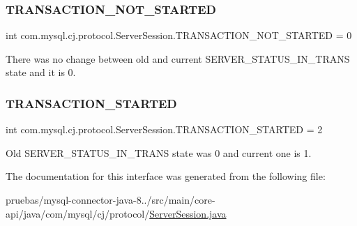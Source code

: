 \subsubsection{\texorpdfstring{T\+R\+A\+N\+S\+A\+C\+T\+I\+O\+N\+\_\+\+N\+O\+T\+\_\+\+S\+T\+A\+R\+T\+ED}{TRANSACTION\_NOT\_STARTED}}
{\footnotesize\ttfamily int com.\+mysql.\+cj.\+protocol.\+Server\+Session.\+T\+R\+A\+N\+S\+A\+C\+T\+I\+O\+N\+\_\+\+N\+O\+T\+\_\+\+S\+T\+A\+R\+T\+ED = 0\hspace{0.3cm}{\ttfamily [static]}}

There was no change between old and current S\+E\+R\+V\+E\+R\+\_\+\+S\+T\+A\+T\+U\+S\+\_\+\+I\+N\+\_\+\+T\+R\+A\+NS state and it is 0. \mbox{\label{interfacecom_1_1mysql_1_1cj_1_1protocol_1_1_server_session_af60b0a2d347c48deeb686f4a47510b5d}} 
\subsubsection{\texorpdfstring{T\+R\+A\+N\+S\+A\+C\+T\+I\+O\+N\+\_\+\+S\+T\+A\+R\+T\+ED}{TRANSACTION\_STARTED}}
{\footnotesize\ttfamily int com.\+mysql.\+cj.\+protocol.\+Server\+Session.\+T\+R\+A\+N\+S\+A\+C\+T\+I\+O\+N\+\_\+\+S\+T\+A\+R\+T\+ED = 2\hspace{0.3cm}{\ttfamily [static]}}

Old S\+E\+R\+V\+E\+R\+\_\+\+S\+T\+A\+T\+U\+S\+\_\+\+I\+N\+\_\+\+T\+R\+A\+NS state was 0 and current one is 1. 

The documentation for this interface was generated from the following file\+:\begin{DoxyCompactItemize}
\item 
pruebas/mysql-\/connector-\/java-\/8../src/main/core-\/api/java/com/mysql/cj/protocol/\mbox{\hyperlink{_server_session_8java}{Server\+Session.\+java}}\end{DoxyCompactItemize}
